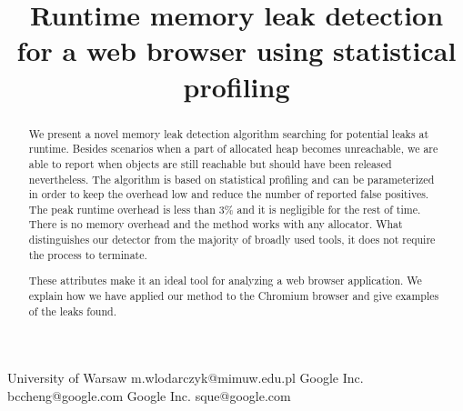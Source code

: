 \documentclass[preprint, numbers]{sigplanconf}
\newcommand{\comment}[1]{{\color{blue}{#1}}}
\newcommand{\todo}[1]{{\color{red}{(TODO: #1)}}}
\begin{document}
\setlength{\pdfpageheight}{\paperheight}
\setlength{\pdfpagewidth}{\paperwidth}




\title{Runtime memory leak detection for a web browser using statistical profiling}
\subtitle{}

           {University of Warsaw}
           {m.wlodarczyk@mimuw.edu.pl}
           {Google Inc.}
           {bccheng@google.com}
           {Google Inc.}
           {sque@google.com}

\maketitle

\begin{abstract}
We present a novel memory leak detection algorithm searching for potential
leaks at runtime.
Besides scenarios when a part of allocated heap becomes unreachable,
we are able to report when objects are still reachable but
should have been released nevertheless.
The algorithm is based on statistical profiling and can be parameterized in order to
keep the overhead low and reduce the number of reported false positives.
The peak runtime overhead is less than 3\% and it is negligible for the rest of time.
There is no memory overhead and the method works
with any allocator.
What distinguishes our detector from the majority of broadly used tools,
it does not require the process to terminate.

These attributes make it an ideal tool for analyzing a web browser application.
We explain how we have applied our method to the Chromium browser and give
examples of the leaks found.

	\comment{This is a draft. All comments about future changes are written in blue.
	Any changes to the authors list?}
	\todo{The red color is reserved for the author's private environment for todos.
	Remember to anonymize the paper before sending to ISMM.}
\end{abstract}
\end{document}
